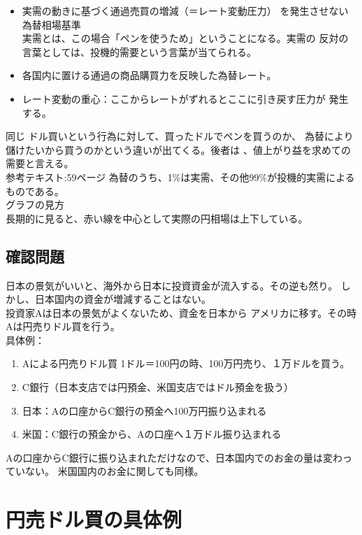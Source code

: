 \documentclass{jsarticle}
\begin{document}
\begin{itemize}
  \item 実需の動きに基づく通過売買の増減（＝レート変動圧力）
  を発生させない為替相場基準\\
  実需とは、この場合「ペンを使うため」ということになる。実需の
  反対の言葉としては、投機的需要という言葉が当てられる。
  \item 各国内に置ける通過の商品購買力を反映した為替レート。
  \item レート変動の重心：ここからレートがずれるとここに引き戻す圧力が
  発生する。
\end{itemize}
同じ
ドル買いという行為に対して、買ったドルでペンを買うのか、
為替により儲けたいから買うのかという違いが出てくる。後者は
、値上がり益を求めての需要と言える。
\\参考テキスト:59ページ
為替のうち、1\%は実需、その他99\%が投機的実需によるものである。\\
グラフの見方\\
長期的に見ると、赤い線を中心として実際の円相場は上下している。\\

\subsection{確認問題}
日本の景気がいいと、海外から日本に投資資金が流入する。その逆も然り。
しかし、日本国内の資金が増減することはない。\\
投資家Aは日本の景気がよくないため、資金を日本から
アメリカに移す。その時Aは円売りドル買を行う。\\
具体例：
\begin{enumerate}
  \item Aによる円売りドル買 1ドル＝100円の時、100万円売り、１万ドルを買う。
  \item C銀行（日本支店では円預金、米国支店ではドル預金を扱う）
  \item 日本：Aの口座からC銀行の預金へ100万円振り込まれる
  \item 米国：C銀行の預金から、Aの口座へ１万ドル振り込まれる

\end{enumerate}
Aの口座からC銀行に振り込まれただけなので、日本国内でのお金の量は変わっていない。
米国国内のお金に関しても同様。

\section{円売ドル買の具体例}
\end{document}
